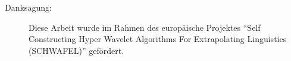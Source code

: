 \documentclass[12pt]{beamer}
\begin{document}
\begin{frame}
	
	\begin{figure}
	\end{figure}
	\small
	\begin{description}
	  \item [Danksagung:] Diese Arbeit wurde im Rahmen des europäische Projektes ``Self Constructing Hyper Wavelet Algorithms For Extrapolating Linguistics (SCHWAFEL)'' gefördert.	
	\end{description}

\end{frame}
\end{document}

